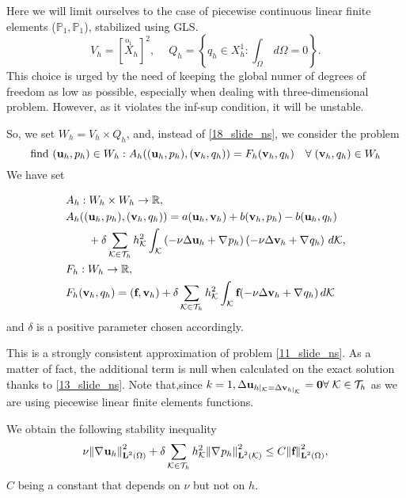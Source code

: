 Here we will limit ourselves to the case of piecewise continuous linear finite elements (\(\mathbb{P}_1, \mathbb{P}_1\)), stabilized using GLS.
\[
    V_h = [\overset{\mathrm{o}_1}{X}_h]^2, \ \quad Q_h = \left\{ q_h \in X_h^1 : \int_\Omega \, d\Omega = 0 \right\}.
\]
This choice is urged by the need of keeping the global numer of degrees of freedom as low as possible, especially when dealing with three-dimensional problem. However, as it violates the inf-sup condition, it will be unstable.

So, we set \(W_h = V_h \times Q_h\), and, instead of \eqref{18_slide_ns}, we consider the problem 
\begin{equation}
    \text{find } (\textbf{u}_h, p_h) \in W_h : A_h ((\textbf{u}_h, p_h), (\textbf{v}_h, q_h)) = F_h (\textbf{v}_h, q_h) \quad \forall \; (\textbf{v}_h, q_h) \in W_h 
    \label{53_slide_ns}
\end{equation}
We have set 

\begin{align*}
    &A_h : W_h \times W_h \to \mathbb{R}, \\
    &A_h((\textbf{u}_h, p_h), (\textbf{v}_h, q_h)) = a(\textbf{u}_h, \textbf{v}_h) + b(\textbf{v}_h, p_h) - b(\textbf{u}_h, q_h) \\
    &\qquad + \delta \sum_{{\mathcal{K}\in\mathcal{T}_h}} h_{\mathcal{K}}^2 \int_{\mathcal{K}} \left( -\nu\Delta \textbf{u}_h + \nabla\mspace{1mu} p_h \right)\left( -\nu \Delta \textbf{v}_h + \nabla\mspace{1mu} q_h \right) \, d\mathcal{K}, \\
    &F_h : W_h \to \mathbb{R}, \\
    &F_h(\textbf{v}_h, q_h) = (\textbf{f},\textbf{v}_h) + \delta \sum_{\mathcal{K}\in\mathcal{T}_h} h^2_{\mathcal{K}} \int_{\mathcal{K}} \textbf{f}(-\nu\Delta \textbf{v}_h + \nabla\mspace{1mu} q_h) \, d\mathcal{K}
\end{align*}
and \(\delta\) is a positive parameter chosen accordingly.

This is a strongly consistent approximation of problem \eqref{11_slide_ns}. As a matter of fact, the additional term is null when calculated on the exact solution thanks to \eqref{13_slide_ns}. Note that,since \(k=1, \Delta \textbf{u}_{h\vert_{\mathcal{K}} = \Delta \textbf{v}_{h\vert_{\mathcal{K}}}} = \textbf{0} \forall \; {\mathcal{K}\in\mathcal{T}_h}\) as we are using piecewise linear finite elements functions.

We obtain the following stability inequality 
\begin{equation}
    \nu \norm{\nabla\mspace{1mu}\textbf{u}_h}_{\textbf{L}^2(\Omega)}^2 + \delta \sum_{\mathcal{K}\in\mathcal{T}_h} h^2_{\mathcal{K}} \norm{\nabla\mspace{1mu} p_h}^2_{\textbf{L}^2 (\mathcal{K})} \leq C \norm{\textbf{f}}^2_{\textbf{L}^2(\Omega)},
    \label{55_slide_ns}
\end{equation}
\(C\) being a constant that depends on \(\nu\) but not on \(h\). 

